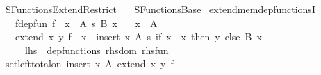 %
\begin{isabellebody}%
%
%
\isadelimdocument
%
\endisadelimdocument
%
\isatagdocument
%
\isamarkuptrue%
%
\endisatagdocument
{\isafolddocument}%
%
\isadelimdocument
%
\endisadelimdocument
%
\isadelimtheory
%
\endisadelimtheory
%
\isatagtheory
{}\isamarkupfalse%
\ SFunctions{\isacharunderscore}{\kern0pt}Extend{\isacharunderscore}{\kern0pt}Restrict\isanewline
\ \ \ SFunctions{\isacharunderscore}{\kern0pt}Base\isanewline
{}%
\endisatagtheory
{\isafoldtheory}%
%
\isadelimtheory
\isanewline
%
\endisadelimtheory
\isanewline
{}\isamarkupfalse%
\ extend{\isacharunderscore}{\kern0pt}mem{\isacharunderscore}{\kern0pt}dep{\isacharunderscore}{\kern0pt}functionsI{\isacharcolon}{\kern0pt}\isanewline
\ \ \ f{\isacharunderscore}{\kern0pt}dep{\isacharunderscore}{\kern0pt}fun{\isacharcolon}{\kern0pt}\ {\isachardoublequoteopen}f\ {\isasymin}\ {\isacharparenleft}{\kern0pt}x\ {\isasymin}\ A{\isacharparenright}{\kern0pt}\ {\isasymrightarrow}s\ {\isacharparenleft}{\kern0pt}B\ x{\isacharparenright}{\kern0pt}{\isachardoublequoteclose}\isanewline
\ \ \ {\isachardoublequoteopen}x\ {\isasymnotin}\ A{\isachardoublequoteclose}\isanewline
\ \ \ {\isachardoublequoteopen}extend\ x\ y\ f\ {\isasymin}\ {\isacharparenleft}{\kern0pt}x{\isacharprime}{\kern0pt}\ {\isasymin}\ insert\ x\ A{\isacharparenright}{\kern0pt}\ {\isasymrightarrow}s\ {\isacharparenleft}{\kern0pt}if\ x{\isacharprime}{\kern0pt}\ {\isacharequal}{\kern0pt}\ x\ then\ {\isacharbraceleft}{\kern0pt}y{\isacharbraceright}{\kern0pt}\ else\ B\ x{\isacharprime}{\kern0pt}{\isacharparenright}{\kern0pt}{\isachardoublequoteclose}\isanewline
\ \ \ \ {\isacharparenleft}{\kern0pt}\ {\isachardoublequoteopen}{\isacharquery}{\kern0pt}lhs\ {\isasymin}\ dep{\isacharunderscore}{\kern0pt}functions\ {\isacharquery}{\kern0pt}rhs{\isacharunderscore}{\kern0pt}dom\ {\isacharquery}{\kern0pt}rhs{\isacharunderscore}{\kern0pt}fun{\isachardoublequoteclose}{\isacharparenright}{\kern0pt}\isanewline
%
\isadelimproof
%
\endisadelimproof
%
\isatagproof
{}\isamarkupfalse%
\isanewline
\ \ \isamarkupfalse%
\ {\isachardoublequoteopen}set{\isacharunderscore}{\kern0pt}left{\isacharunderscore}{\kern0pt}total{\isacharunderscore}{\kern0pt}on\ {\isacharparenleft}{\kern0pt}insert\ x\ A{\isacharparenright}{\kern0pt}\ {\isacharparenleft}{\kern0pt}extend\ x\ y\ f{\isacharparenright}{\kern0pt}{\isachardoublequoteclose}\isanewline

\end{isabellebody}
